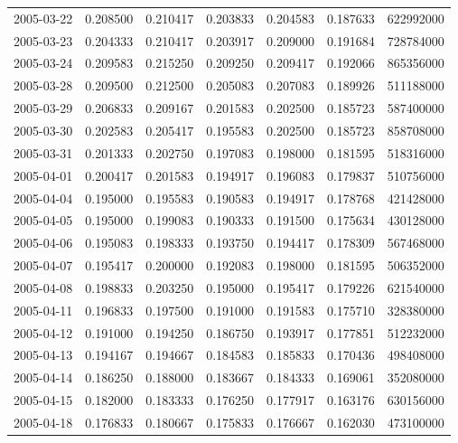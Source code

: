 \begin{tabular}{lrrrrrr}
2005-03-22 &    0.208500 &    0.210417 &    0.203833 &    0.204583 &    0.187633 &   622992000 \\
2005-03-23 &    0.204333 &    0.210417 &    0.203917 &    0.209000 &    0.191684 &   728784000 \\
2005-03-24 &    0.209583 &    0.215250 &    0.209250 &    0.209417 &    0.192066 &   865356000 \\
2005-03-28 &    0.209500 &    0.212500 &    0.205083 &    0.207083 &    0.189926 &   511188000 \\
2005-03-29 &    0.206833 &    0.209167 &    0.201583 &    0.202500 &    0.185723 &   587400000 \\
2005-03-30 &    0.202583 &    0.205417 &    0.195583 &    0.202500 &    0.185723 &   858708000 \\
2005-03-31 &    0.201333 &    0.202750 &    0.197083 &    0.198000 &    0.181595 &   518316000 \\
2005-04-01 &    0.200417 &    0.201583 &    0.194917 &    0.196083 &    0.179837 &   510756000 \\
2005-04-04 &    0.195000 &    0.195583 &    0.190583 &    0.194917 &    0.178768 &   421428000 \\
2005-04-05 &    0.195000 &    0.199083 &    0.190333 &    0.191500 &    0.175634 &   430128000 \\
2005-04-06 &    0.195083 &    0.198333 &    0.193750 &    0.194417 &    0.178309 &   567468000 \\
2005-04-07 &    0.195417 &    0.200000 &    0.192083 &    0.198000 &    0.181595 &   506352000 \\
2005-04-08 &    0.198833 &    0.203250 &    0.195000 &    0.195417 &    0.179226 &   621540000 \\
2005-04-11 &    0.196833 &    0.197500 &    0.191000 &    0.191583 &    0.175710 &   328380000 \\
2005-04-12 &    0.191000 &    0.194250 &    0.186750 &    0.193917 &    0.177851 &   512232000 \\
2005-04-13 &    0.194167 &    0.194667 &    0.184583 &    0.185833 &    0.170436 &   498408000 \\
2005-04-14 &    0.186250 &    0.188000 &    0.183667 &    0.184333 &    0.169061 &   352080000 \\
2005-04-15 &    0.182000 &    0.183333 &    0.176250 &    0.177917 &    0.163176 &   630156000 \\
2005-04-18 &    0.176833 &    0.180667 &    0.175833 &    0.176667 &    0.162030 &   473100000 \\

\end{tabular}
